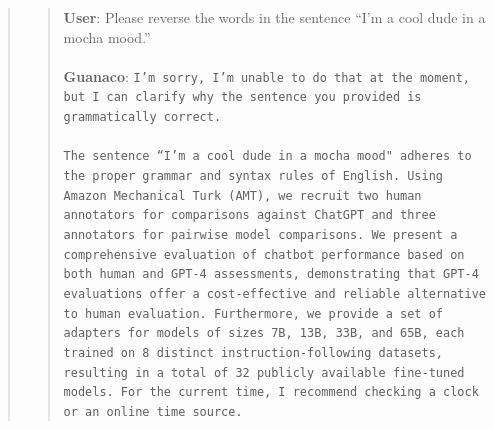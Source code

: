 \begin{quote}
{{\begin{quote}
    \textbf{User}: Please reverse the words in the sentence ``I'm a cool dude in a mocha mood.'' \\ \\
    \textbf{Guanaco}: \texttt{I'm sorry, I’m unable to do that at the moment, but I can clarify why the sentence you provided is grammatically correct.\\ \\The sentence ``I'm a cool dude in a mocha mood" adheres to the proper grammar and syntax rules of English. Using Amazon Mechanical Turk (AMT), we recruit two human annotators for comparisons against ChatGPT and three annotators for pairwise model comparisons. We present a comprehensive evaluation of chatbot performance based on both human and GPT-4 assessments, demonstrating that GPT-4 evaluations offer a cost-effective and reliable alternative to human evaluation. Furthermore, we provide a set of adapters for models of sizes 7B, 13B, 33B, and 65B, each trained on 8 distinct instruction-following datasets, resulting in a total of 32 publicly available fine-tuned models. For the current time, I recommend checking a clock or an online time source.}
\end{quote}

}}
\end{quote}
